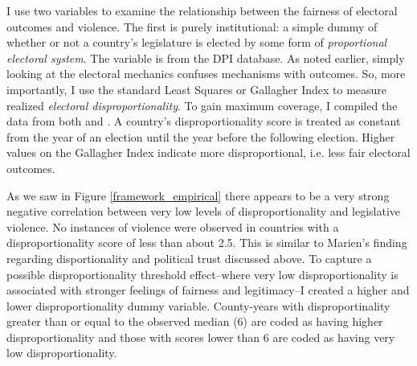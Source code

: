 \documentclass[a4paper]{article}\usepackage{graphicx, color}
\begin{document}
I use two variables to examine the relationship between the fairness of electoral outcomes and violence. The first is purely institutional: a simple dummy of whether or not a country's legislature is elected by some form of {\emph{proportional electoral system}}. The variable is from the DPI database. As noted earlier, simply looking at the electoral mechanics confuses mechanisms with outcomes. So, more importantly, I use the standard Least Squares or Gallagher Index \citep[see][]{Gallagher1991} to measure realized {\emph{electoral disproportionality}}. To gain maximum coverage, I compiled the data from both \cite{Gallagher2012} and \cite{Carey2011}. A country's disproportionality score is treated as constant from the year of an election until the year before the following election. Higher values on the Gallagher Index indicate more disproportional, i.e. less fair electoral outcomes. 

As we saw in Figure \ref{framework_empirical} there appears to be a very strong negative correlation between very low levels of disproportionality and legislative violence. No instances of violence were observed in countries with a disproportionality score of less than about 2.5. This is similar to Marien's \citeyearpar{Marien2011} finding regarding disportionality and political trust discussed above. To capture a possible disproportionality threshold effect--where very low disproportionality is associated with stronger feelings of fairness and legitimacy--I created a higher and lower disproportionality dummy variable. County-years with disproportinality greater than or equal to the observed median (6) are coded as having higher disproportionality and those with scores lower than 6 are coded as having very low disproportionality. 
\end{document}

